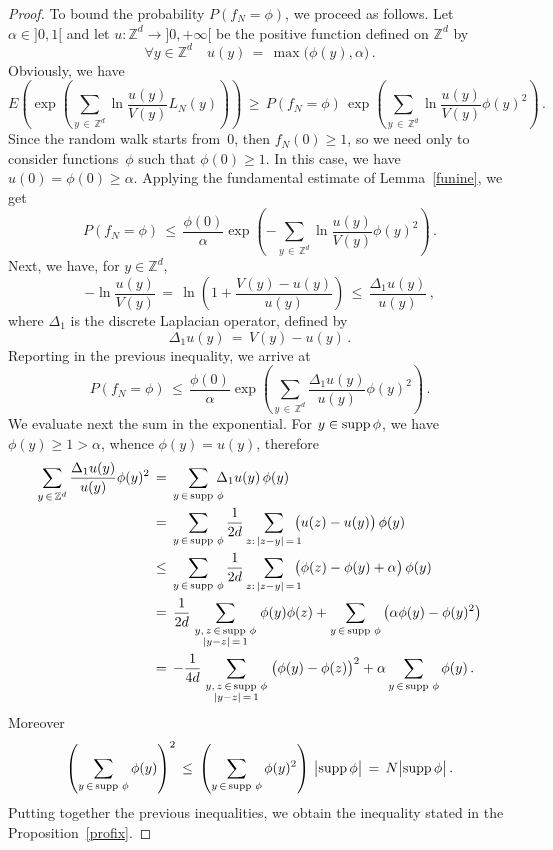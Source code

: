 \documentclass[AHL, Unicode, longabstracts, published]{cedram}
\newcommand{\tatop}[2]{\genfrac{}{}{0pt}{1}{#1}{#2}}
\newcommand*\supp{\text{supp\,}}
\newcommand*\Zd {{\mathbb Z^d}}
\let\oldforall\forall
\renewcommand*{\forall}{\mathrel{\oldforall}}
\begin{document}
\begin{proof}
To bound the probability $P(f_N=\phi)$, we proceed as follows. Let $\alpha\in]0,1[$ and let $u:\Zd\to]0,+\infty[$ be the positive function defined on $\Zd$ by
\[
\forall y\in\Zd\quad u(y)\,=\,\max\big(\phi(y),\alpha\big)\,.
\]
Obviously, we have
\[
E\left(\exp\left(\sum_{y\,\in\,\Zd}\ln
\frac{u(y)}{V(y)}L_N(y)\right)
\right)\,\geq\, P(f_N=\phi)\,
\exp\left(\sum_{y\,\in\,\Zd}\ln
\frac{u(y)}{V(y)}\phi(y)^2\right)\,.
\]
Since the random walk starts from~$0$, then $f_N(0)\geq 1$, so we need only to consider functions~$\phi$ such that $\phi(0)\geq 1$. In this case, we have $u(0)=\phi(0)\geq\alpha$. Applying the fundamental estimate of Lemma~\ref{funine}, we get
\[
P(f_N=\phi)\,\leq\,
\frac{\phi(0)}{\alpha}
\exp\left(-\sum_{y\,\in\,\Zd}\ln
\frac{u(y)}{V(y)}\phi(y)^2\right)\,.
\]
Next, we have, for $y\in\Zd$,
\[
-\ln
\frac{u(y)}{V(y)}\,=\,
\ln\left(1+\frac{V(y)-u(y)}{u(y)}
\right)
\,\leq\,\frac{\Delta_1 u(y)}{u(y)}\,,
\]
where $\Delta_1$ is the discrete Laplacian operator, defined by
\[
\Delta_1u(y)\,=\,V(y)-u(y)\,.
\]
Reporting in the previous inequality, we arrive at
\[
P(f_N=\phi)\,\leq\,
\frac{\phi(0)}{\alpha}
\exp\left(\sum_{y\,\in\,\Zd}
\frac{\Delta_1u(y)}{u(y)}\phi(y)^2\right)\,.
\]
We evaluate next the sum in the exponential. For $y\in\supp\phi$, we have $\phi(y)\geq 1>\alpha$, whence $\phi(y)=u(y)$, therefore
\begin{align*}
\sum_{y\,\in\,\Zd}
\frac{\Delta_1u(y)}{u(y)}\phi(y)^2\,&=\,
\sum_{y\,\in\,\supp\,\phi}\kern-7pt {\Delta_1u(y)}\,\phi(y)\\
\,&=\,
\sum_{y\,\in\,\supp\,\phi}
\frac{1}{2d}
\sum_{z:\,|z-y|\,=\,1}\kern-7pt
\big(u(z)-u(y)\big)
\,\phi(y)\\
\,&\leq \,
\sum_{y\,\in\,\supp\,\phi}
\frac{1}{2d}
\sum_{z:\,|z-y|\,=\,1}\kern-7pt
\big(
\phi(z)-\phi(y)+\alpha\big)
\,\phi(y)\\
\,&= \,
\frac{1}{2d}
\sum_{\tatop{y,\,z\,\in\,\supp\,\phi}{|y-z|\,=\,1}}
\phi(y)\phi(z)+
\sum_{y\,\in\,\supp\,\phi}\big(\alpha\phi(y)-\phi(y)^2\big)\\
\,&= \, -\frac{1}{4d}
\sum_{\tatop{y,\,z\,\in\,\supp\,\phi}{|y-z|\,=\,1}}
\big(\phi(y)-\phi(z)\big)^2+
\alpha\sum_{y\,\in\,\supp\,\phi}\phi(y)\,.
\end{align*}
Moreover
\[
\left(\sum_{y\,\in\,\supp\,\phi}\phi(y)\right)^2\,\leq\,
\left(\sum_{y\,\in\,\supp\,\phi}\phi(y)^2\right)
\,\big|\supp\phi\big|
\,=\, N\big|\supp\phi\big|
\,.
\]
Putting together the previous inequalities, we obtain the inequality stated in the Proposition~\ref{profix}.
\end{proof}
\end{document}

